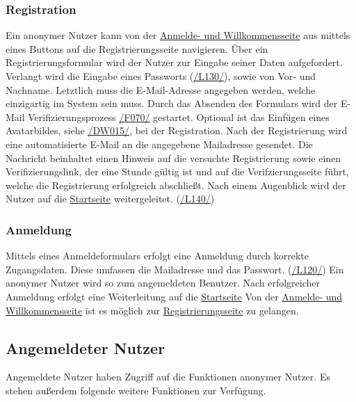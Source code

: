 \subsubsection{Registration}\label{an:reg}
\begin{description}
     Ein anonymer Nutzer kann von der \hyperref[an:log]{Anmelde- und Willkommensseite} aus mittels eines
    Buttons auf die Registrierungsseite navigieren.
     Über ein Registrierungsformular wird der Nutzer zur Eingabe seiner
    Daten aufgefordert. Verlangt wird die Eingabe eines Passworts (\hyperref[leist:130]{/L130/}),
    sowie von Vor- und Nachname. Letztlich muss die E-Mail-Adresse
    angegeben werden, welche einzigartig im System sein muss. Durch das Absenden des Formulars wird der E-Mail Verifizierungsprozess
    \hyperref[funkt:070]{/F070/} gestartet.
     Optional ist das Einfügen eines Avatarbildes, siehe \hyperref[d015]{/DW015/},
    bei der Registration.
     Nach der Registrierung wird eine automatisierte E-Mail
    an die angegebene Mailadresse gesendet. Die Nachricht beinhaltet einen Hinweis auf
    die versuchte Registrierung sowie einen Verifizierungslink, der eine Stunde gültig ist und auf die Verifzierungsseite führt, welche
    die Registrierung erfolgreich abschließt. Nach einem Augenblick wird der Nutzer
    auf die \hyperref[nut:start]{Startseite} weitergeleitet. (\hyperref[leist:140]{/L140/})
\end{description}

\subsubsection{Anmeldung}\label{an:log}
\begin{description}
     Mittels eines Anmeldeformulars erfolgt eine Anmeldung durch korrekte Zugangsdaten.
    Diese umfassen die Mailadresse und das Passwort. (\hyperref[leist:120]{/L120/})
    Ein anonymer Nutzer wird so zum angemeldeten Benutzer.
    Nach erfolgreicher Anmeldung erfolgt eine Weiterleitung auf die \hyperref[nut:start]{Startseite}
     Von der \hyperref[an:log]{Anmelde- und Willkommensseite} ist es möglich zur \hyperref[an:reg]{Registrierungsseite} zu gelangen.
\end{description}

\subsection{Angemeldeter Nutzer}
Angemeldete Nutzer haben Zugriff auf die Funktionen anonymer Nutzer.
Es stehen außerdem folgende weitere Funktionen zur Verfügung.

